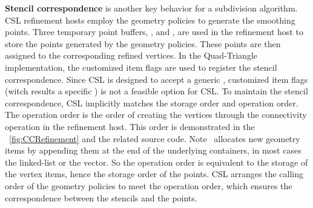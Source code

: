 \noindent \textbf{Stencil correspondence} is another key
behavior for a subdivision algorithm.
CSL refinement hosts employ the geometry policies
to generate the smoothing points. 
Three temporary point buffers, , 
 and , 
are used in the refinement host to store the points generated
by the geometry policies. These points are then assigned 
to the corresponding refined vertices. In the Quad-Triangle
implementation, the customized item flags are used
to register the stencil correspondence.  
Since CSL is designed to accept a generic \cgalpoly , 
customized item flags (witch results a specific \cgalpoly) 
is not a feasible option for CSL. To maintain the stencil 
correspondence, CSL implicitly matches the storage 
order and operation order. The operation order is the
order of creating the vertices through the connectivity
operation in the refinement host. This order is demonstrated
in the \figurename\ \ref{fig:CCRefinement} and the related 
source code. Note \cgalpoly\ allocates new
geometry items by appending them at the end of the underlying
containers, in most cases the linked-list or the vector.
So the operation order is equivalent to the storage of the 
vertex items, hence the storage order of the points.
CSL arranges the calling order of the geometry policies
to meet the operation order, which ensures the 
correspondence between the stencils and the points.

